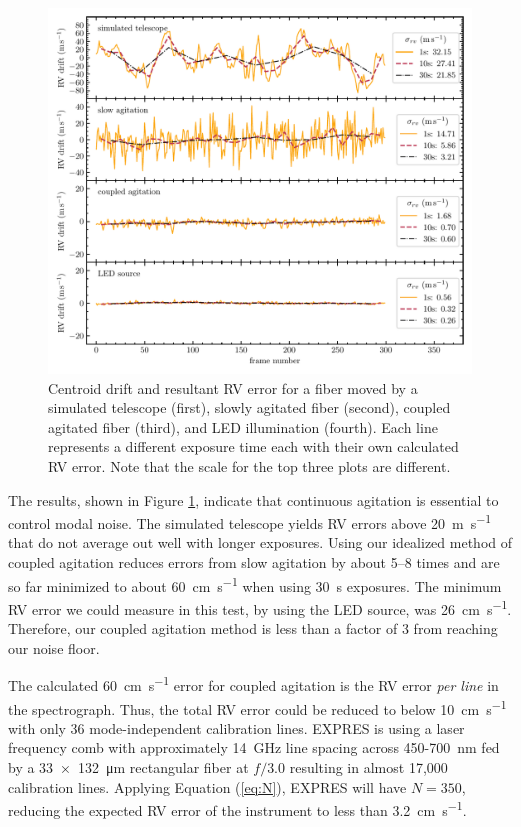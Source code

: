 \documentclass[11pt]{article}
\begin{document}
\begin{figure}
\centering
	\includegraphics[width=\textwidth]{images/rv_error.pdf}
	\caption{Centroid drift and resultant RV error for a fiber moved by a simulated telescope (first), slowly agitated fiber (second), coupled agitated fiber (third), and LED illumination (fourth). Each line represents a different exposure time each with their own calculated RV error. Note that the scale for the top three plots are different.}
\label{fig:rv_error}
\end{figure}

The results, shown in Figure \ref{fig:rv_error}, indicate that continuous agitation is essential to control modal noise. The simulated telescope yields RV errors above \SI{20}{\meter\per\second} that do not average out well with longer exposures. Using our idealized method of coupled agitation reduces errors from slow agitation by about 5--8 times and are so far minimized to about \SI{60}{\centi\meter\per\second} when using \SI{30}{\second} exposures. The minimum RV error we could measure in this test, by using the LED source, was \SI{26}{\centi\meter\per\second}. Therefore, our coupled agitation method is less than a factor of 3 from reaching our noise floor.

The calculated \SI{60}{\centi\meter\per\second} error for coupled agitation is the RV error \textit{per line} in the spectrograph. Thus, the total RV error could be reduced to below \SI{10}{\centi\meter\per\second} with only 36 mode-independent calibration lines. EXPRES is using a laser frequency comb with approximately {\SI{14}{\giga\hertz}} line spacing across 450-{\SI{700}{\nano\meter}} fed by a {\SI{33x132}{\micro\meter}} rectangular fiber at $f/3.0$ resulting in almost 17,000 calibration lines. Applying Equation (\ref{eq:N}), EXPRES will have $N=350$, reducing the expected RV error of the instrument to less than {\SI{3.2}{\centi\meter\per\second}}.
\end{document}
